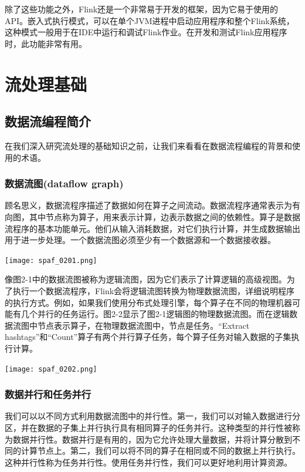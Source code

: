 \documentclass[oneside]{ctexbook}
\begin{document}
除了这些功能之外，Flink还是一个非常易于开发的框架，因为它易于使用的API。嵌入式执行模式，可以在单个JVM进程中启动应用程序和整个Flink系统，这种模式一般用于在IDE中运行和调试Flink作业。在开发和测试Flink应用程序时，此功能非常有用。


\chapter{流处理基础}

\section{数据流编程简介}

在我们深入研究流处理的基础知识之前，让我们来看看在数据流程编程的背景和使用的术语。

\subsection{数据流图(dataflow graph)}

顾名思义，数据流程序描述了数据如何在算子之间流动。数据流程序通常表示为有向图，其中节点称为算子，用来表示计算，边表示数据之间的依赖性。算子是数据流程序的基本功能单元。他们从输入消耗数据，对它们执行计算，并生成数据输出用于进一步处理。一个数据流图必须至少有一个数据源和一个数据接收器。

\noindent\texttt{[image: spaf\_0201.png]}

像图2-1中的数据流图被称为逻辑流图，因为它们表示了计算逻辑的高级视图。为了执行一个数据流程序，Flink会将逻辑流图转换为物理数据流图，详细说明程序的执行方式。例如，如果我们使用分布式处理引擎，每个算子在不同的物理机器可能有几个并行的任务运行。图2-2显示了图2-1逻辑图的物理数据流图。而在逻辑数据流图中节点表示算子，在物理数据流图中，节点是任务。“Extract hashtags”和“Count”算子有两个并行算子任务，每个算子任务对输入数据的子集执行计算。

\noindent\texttt{[image: spaf\_0202.png]}

\subsection{数据并行和任务并行}

我们可以以不同方式利用数据流图中的并行性。第一，我们可以对输入数据进行分区，并在数据的子集上并行执行具有相同算子的任务并行。这种类型的并行性被称为数据并行性。数据并行是有用的，因为它允许处理大量数据，并将计算分散到不同的计算节点上。第二，我们可以将不同的算子在相同或不同的数据上并行执行。这种并行性称为任务并行性。使用任务并行性，我们可以更好地利用计算资源。
\end{document}
